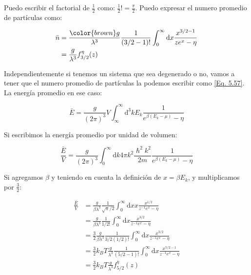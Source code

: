 \documentclass[11pt,fleqn]{book}
\begin{document}
Puedo escribir el factorial de $\frac{1}{2}$ como: $\frac{1}{2}!=\frac{\pi}{2}$. Puedo expresar el numero promedio de partículas como:

\begin{equation}
    \begin{split}
        \bar{n}&=\frac{{\color{brown}g}}{\lambda^{3}}\frac{1}{(3/2-1)!}\int_{0}^{{\infty}}\mathrm{d}x\frac{x^{3/2-1}}{ze^{x}-\eta}    \\
        &=\frac{g}{\lambda^{3}}f_{3/2}^{\eta}(z)
    \end{split}
    \label{Eq. 5.57}
\end{equation}

Independientemente si tenemos un sistema que sea degenerado o no, vamos a tener que el numero promedio de partículas la podemos escribir como \ref{Eq. 5.57}. La energía promedio en ese caso:

\begin{equation}
    \bar{E}=\frac{g}{(2\pi)^{3}}V\int_{\infty}^{{\infty}}\mathrm{d}^{3}kE_{k}\frac{1}{e^{\beta(E_{k}-\mu)}-\eta}
\end{equation}

Si escribimos la energía promedio por unidad de volumen:

\begin{equation}
      \frac{\bar{E}}{V}=\frac{g}{(2\pi)^{3}}\int_{0}^{{\infty}}\mathrm{d}k4\pi k^{2}\frac{\hslash^{2}k^{2}}{2m}\frac{1}{e^{\beta(E_{k}-\mu)}-\eta}
\end{equation}

Si agregamos $\beta$ y teniendo en cuenta la definición de $x=\beta E_{k}$, y multiplicamos por $\frac{3}{2}$:

\begin{equation}
    \begin{split}
        \frac{\bar{E}}{V}&=\frac{g}{\beta\lambda^{3}}\frac{1}{\sqrt{\pi}/2}\int_{0}^{{\infty}}\mathrm{d}xx\frac{x^{1/2}}{z^{-1}e^{x}-\eta} \\
         &=\frac{g}{\beta\lambda^{3}}\frac{1}{1/2!}\int_{0}^{{\infty}}\mathrm{d}x\frac{x^{3/2}}{z^{-1}e^{x}-\eta} \\
        &=\frac{3}{2}\frac{g}{\beta\lambda^{3}}\frac{1}{3/2(1/2)!}\int_{0}^{{\infty}}\mathrm{d}x\frac{x^{3/2}}{z^{-1}e^{x}-\eta} \\
        &=\frac{3}{2}k_{B}T\frac{g}{\lambda^{3}}\frac{1}{(5/2-1)!}\int_{0}^{{\infty}}\mathrm{d}x\frac{x^{5/2-1}}{z^{-1}e^{x}-\eta} \\
        &=\frac{3}{2}k_{B}T\frac{g}{\lambda^{3}}f_{5/2}^{\eta}(z)
    \end{split}
    \label{Eq. 5.60}
\end{equation}
\end{document}
